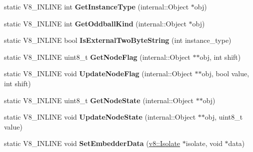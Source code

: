 \begin{DoxyCompactItemize}
\item 
\hypertarget{classv8_1_1internal_1_1_internals_a7262da07b4ed930b2ccf2d83ba7b4b56}{}static V8\+\_\+\+I\+N\+L\+I\+N\+E int {\bfseries Get\+Instance\+Type} (internal\+::\+Object $\ast$obj)\label{classv8_1_1internal_1_1_internals_a7262da07b4ed930b2ccf2d83ba7b4b56}

\item 
\hypertarget{classv8_1_1internal_1_1_internals_a2891c298313f75dc8fe1c7ee6877412e}{}static V8\+\_\+\+I\+N\+L\+I\+N\+E int {\bfseries Get\+Oddball\+Kind} (internal\+::\+Object $\ast$obj)\label{classv8_1_1internal_1_1_internals_a2891c298313f75dc8fe1c7ee6877412e}

\item 
\hypertarget{classv8_1_1internal_1_1_internals_afbf930e9dfde745b54e1e7e03b5b96c8}{}static V8\+\_\+\+I\+N\+L\+I\+N\+E bool {\bfseries Is\+External\+Two\+Byte\+String} (int instance\+\_\+type)\label{classv8_1_1internal_1_1_internals_afbf930e9dfde745b54e1e7e03b5b96c8}

\item 
\hypertarget{classv8_1_1internal_1_1_internals_aa7df51a3da3e021e2bd4426461e6d1fb}{}static V8\+\_\+\+I\+N\+L\+I\+N\+E uint8\+\_\+t {\bfseries Get\+Node\+Flag} (internal\+::\+Object $\ast$$\ast$obj, int shift)\label{classv8_1_1internal_1_1_internals_aa7df51a3da3e021e2bd4426461e6d1fb}

\item 
\hypertarget{classv8_1_1internal_1_1_internals_a868ffed15d660ac6959597e45a353d6e}{}static V8\+\_\+\+I\+N\+L\+I\+N\+E void {\bfseries Update\+Node\+Flag} (internal\+::\+Object $\ast$$\ast$obj, bool value, int shift)\label{classv8_1_1internal_1_1_internals_a868ffed15d660ac6959597e45a353d6e}

\item 
\hypertarget{classv8_1_1internal_1_1_internals_a76c388eb1d813144512b0af2d1c5ac7b}{}static V8\+\_\+\+I\+N\+L\+I\+N\+E uint8\+\_\+t {\bfseries Get\+Node\+State} (internal\+::\+Object $\ast$$\ast$obj)\label{classv8_1_1internal_1_1_internals_a76c388eb1d813144512b0af2d1c5ac7b}

\item 
\hypertarget{classv8_1_1internal_1_1_internals_a0f37a58646403a6a39f925006a98a0d0}{}static V8\+\_\+\+I\+N\+L\+I\+N\+E void {\bfseries Update\+Node\+State} (internal\+::\+Object $\ast$$\ast$obj, uint8\+\_\+t value)\label{classv8_1_1internal_1_1_internals_a0f37a58646403a6a39f925006a98a0d0}

\item 
\hypertarget{classv8_1_1internal_1_1_internals_a43d48b22da06ab53d8236628215084dd}{}static V8\+\_\+\+I\+N\+L\+I\+N\+E void {\bfseries Set\+Embedder\+Data} (\hyperlink{classv8_1_1_isolate}{v8\+::\+Isolate} $\ast$isolate, void $\ast$data)\label{classv8_1_1internal_1_1_internals_a43d48b22da06ab53d8236628215084dd}


\end{DoxyCompactItemize}
